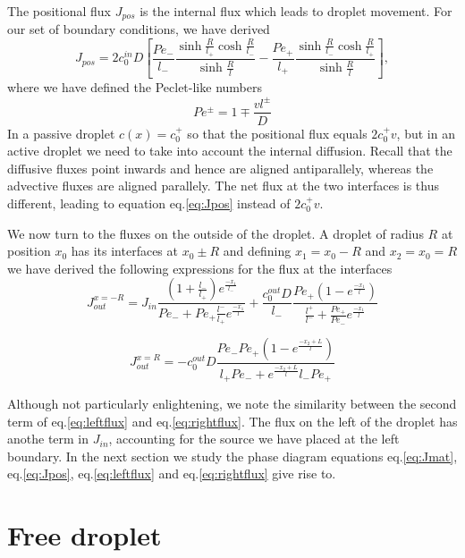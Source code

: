 \documentclass{Dissertate}
\begin{document}
The positional flux \(J_{pos}\) is the internal flux which leads to
droplet movement. For our set of boundary conditions, we have derived
\begin{equation}
J_{pos} = 2c_0^{in}D\left[\frac{Pe_-}{l_-}\frac{\sinh\frac{R}{l_+}\cosh\frac{R}{l_-}}{\sinh\frac{R}{l}}-\frac{Pe_+}{l_+}\frac{\sinh\frac{R}{l_-}\cosh\frac{R}{l_+}}{\sinh\frac{R}{l}}\right],
\label{eq:Jpos}\end{equation} where we have defined the Peclet-like
numbers \[
Pe^\pm = 1 \mp \frac{vl^\pm}{D}
\] In a passive droplet \(c(x)=c_0^+\) so that the positional flux
equals \(2c_0^+v\), but in an active droplet we need to take into
account the internal diffusion. Recall that the diffusive fluxes point
inwards and hence are aligned antiparallely, whereas the advective
fluxes are aligned parallely. The net flux at the two interfaces is thus
different, leading to equation eq.\ref{eq:Jpos} instead of \(2c_0^+v\).

We now turn to the fluxes on the outside of the droplet. A droplet of
radius \(R\) at position \(x_0\) has its interfaces at \(x_0 \pm R\) and
defining \(x_1=x_0-R\) and \(x_2=x_0=R\) we have derived the following
expressions for the flux at the interfaces \begin{equation}
J_{out}^{x=-R} = J_{in}\frac{(1+\frac{l_-}{l_+})e^{\frac{-x_1}{l_-}}}{Pe_-+Pe_+\frac{l^-}{l_+}e^{\frac{-x_1}{l}}}
+\frac{c_0^{out}D}{l_-}\frac{Pe_+(1-e^{\frac{-x_1}{l}})}{\frac{l^+}{l^-}+\frac{Pe_+}{Pe_-}e^{\frac{-x_1}{l}}}
\label{eq:leftflux}\end{equation}

\begin{equation}
J_{out}^{x=R} = -c_0^{out}D\frac{Pe_-Pe_+(1-e^{\frac{-x_2+L}{l}})}{l_+Pe_-+e^{\frac{-x_2+L}{l}}l_-Pe_+}
\label{eq:rightflux}\end{equation}

Although not particularly enlightening, we note the similarity between
the second term of eq.\ref{eq:leftflux} and eq.\ref{eq:rightflux}. The
flux on the left of the droplet has anothe term in \(J_{in}\),
accounting for the source we have placed at the left boundary. In the
next section we study the phase diagram equations eq.\ref{eq:Jmat},
eq.\ref{eq:Jpos}, eq.\ref{eq:leftflux} and eq.\ref{eq:rightflux} give
rise to.

\hypertarget{free-droplet}{%
\section{Free droplet}\label{free-droplet}}
\end{document}
